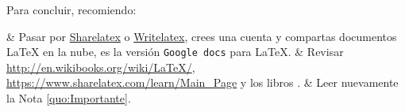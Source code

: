 Para concluir, recomiendo:
\Activate
\begin{easylist}[itemize]	
	& Pasar por \href{https://www.sharelatex.com/}{Sharelatex} o \href{https://www.writelatex.com/}{Writelatex}, crees una cuenta y compartas documentos {\LaTeX} en la nube, es la versión \verb|Google docs| para {\LaTeX}.
	& Revisar \url{http://en.wikibooks.org/wiki/LaTeX/}, \url{https://www.sharelatex.com/learn/Main_Page} y los libros \citet{F.2012,Oetiker2014,Talbot}.
	& Leer nuevamente la Nota \ref{quo:Importante}.
\end{easylist}
\Deactivate


